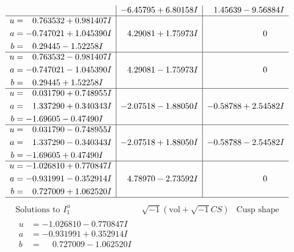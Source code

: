 \documentclass[1p]{elsarticle_modified}
\theoremstyle{definition}
\newcommand{\I}{\sqrt{-1}}
\begin{document}
$$\begin{array}{c|c|c}
 & -6.45795 + 6.80158 I & \phantom{-}1.45639 - 9.56884 I \\ \hline\begin{aligned}
u &= \phantom{-}0.763532 + 0.981407 I \\
a &= -0.747021 + 1.045390 I \\
b &= \phantom{-}0.29445 - 1.52258 I\end{aligned}
 & \phantom{-}4.29081 + 1.75973 I & \phantom{-0.000000 } 0 \\ \hline\begin{aligned}
u &= \phantom{-}0.763532 - 0.981407 I \\
a &= -0.747021 - 1.045390 I \\
b &= \phantom{-}0.29445 + 1.52258 I\end{aligned}
 & \phantom{-}4.29081 - 1.75973 I & \phantom{-0.000000 } 0 \\ \hline\begin{aligned}
u &= \phantom{-}0.031790 + 0.748955 I \\
a &= \phantom{-}1.337290 + 0.340343 I \\
b &= -1.69605 - 0.47490 I\end{aligned}
 & -2.07518 - 1.88050 I & -0.58788 + 2.54582 I \\ \hline\begin{aligned}
u &= \phantom{-}0.031790 - 0.748955 I \\
a &= \phantom{-}1.337290 - 0.340343 I \\
b &= -1.69605 + 0.47490 I\end{aligned}
 & -2.07518 + 1.88050 I & -0.58788 - 2.54582 I \\ \hline\begin{aligned}
u &= -1.026810 + 0.770847 I \\
a &= -0.931991 - 0.352914 I \\
b &= \phantom{-}0.727009 + 1.062520 I\end{aligned}
 & \phantom{-}4.78970 - 2.73592 I & \phantom{-0.000000 } 0\\
 \hline 
 \end{array}$$\newpage$$\begin{array}{c|c|c}  
\text{Solutions to }I^u_{1}& \I (\text{vol} + \sqrt{-1}CS) & \text{Cusp shape}\\
 \hline 
\begin{aligned}
u &= -1.026810 - 0.770847 I \\
a &= -0.931991 + 0.352914 I \\
b &= \phantom{-}0.727009 - 1.062520 I\end{aligned}

\end{array}$$
\end{document}

